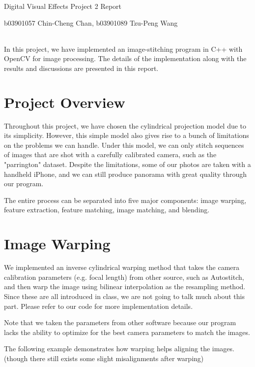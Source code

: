 \documentclass[a4paper]{article}
\begin{document}
{\centering\huge Digital Visual Effects Project 2 Report\par}
{\centering b03901057 Chin-Cheng Chan, b03901089 Tzu-Peng Wang\par}
\noindent\makebox[\linewidth]{\rule{16cm}{1pt}} \\

In this project, we have implemented an image-stitching program in C++ with OpenCV
for image processing. The details of the implementation along with the results and
discussions are presented in this report.

\section{Project Overview}
Throughout this project, we have chosen the cylindrical projection model due to
its simplicity. However, this simple model also gives rise to a bunch of limitations
on the problems we can handle. Under this model, we can only stitch sequences of
images that are shot with a carefully calibrated camera, such as the "parrington"
dataset. Despite the limitations, some of our photos are taken with a handheld
iPhone, and we can still produce panorama with great quality through our program.

The entire process can be separated into five major components: image warping,
feature extraction, feature matching, image matching, and blending.

\section{Image Warping}
We implemented an inverse cylindrical warping method that takes the camera calibration
parameters (e.g. focal length) from other source, such as Autostitch, and then warp the
image using bilinear interpolation as the resampling method. Since these are all
introduced in class, we are not going to talk much about this part. Please refer
to our code for more implementation details.

Note that we taken the parameters from other software because our program lacks
the ability to optimize for the best camera parameters to match the images.

The following example demonstrates how warping helps aligning the images. (though
there still exists some slight misalignments after warping)
\end{document}

